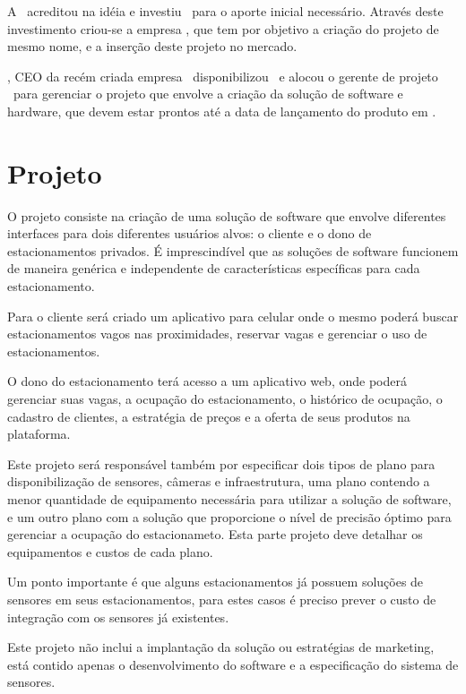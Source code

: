 A \investorCompanyName{}\ acreditou na idéia e investiu \ventureBudget{}\ para o aporte inicial necessário. Através deste investimento criou-se a empresa \startupCompanyName{}, que tem por objetivo a criação do projeto de mesmo nome, e a inserção deste projeto no mercado.

\ceoName{}, CEO da recém criada empresa \startupCompanyName{}\, disponibilizou \maximumBudget{}\ e alocou o gerente de projeto \projectManagerName{}\ para gerenciar o projeto que envolve a criação da solução de software e hardware, que devem estar prontos até a data de lançamento do produto em \maximumDeadline{}.



\section{Projeto}

O projeto consiste na criação de uma solução de software que envolve diferentes interfaces para dois diferentes usuários alvos: o cliente e o dono de estacionamentos privados. É imprescindível que as soluções de software funcionem de maneira genérica e independente de características específicas para cada estacionamento. 

Para o cliente será criado um aplicativo para celular onde o mesmo poderá buscar estacionamentos vagos nas proximidades, reservar vagas e gerenciar o uso de estacionamentos.

O dono do estacionamento terá acesso a um aplicativo web, onde poderá gerenciar suas vagas, a ocupação do estacionamento, o histórico de ocupação, o cadastro de clientes, a estratégia de preços e a oferta de seus produtos na plataforma.

Este projeto será responsável também por especificar dois tipos de plano para disponibilização de sensores, câmeras e infraestrutura, uma plano contendo a menor quantidade de equipamento necessária para utilizar a solução de software, e um outro plano com a solução que proporcione o nível de precisão óptimo para gerenciar a ocupação do estacionameto. Esta parte projeto deve detalhar os equipamentos e custos de cada plano.

Um ponto importante é que alguns estacionamentos já possuem soluções de sensores em seus estacionamentos, para estes casos é preciso prever o custo de integração com os sensores já existentes.

Este projeto não inclui a implantação da solução ou estratégias de marketing, está contido apenas o desenvolvimento do software e a especificação do sistema de sensores.